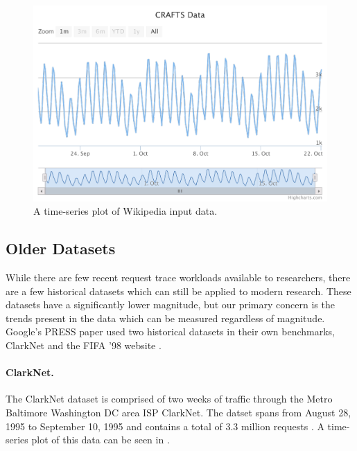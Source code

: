 \begin{figure}
\centering
\includegraphics[width=\textwidth]{charts/wikibench.pdf}
\caption{A time-series plot of Wikipedia input data.}
\label{fig:wikibench}
\end{figure}

\subsection{Older Datasets}
While there are few recent request trace workloads available to researchers, there are a few historical datasets which can still be applied to modern research. These datasets have a significantly lower magnitude, but our primary concern is the trends present in the data which can be measured regardless of magnitude. Google's PRESS paper used two historical datasets in their own benchmarks, ClarkNet and the FIFA '98 website \cite{gong2010press}.

\paragraph{ClarkNet.} The ClarkNet dataset is comprised of two weeks of traffic through the Metro Baltimore Washington DC area ISP ClarkNet. The datset spans from August 28, 1995 to September 10, 1995 and contains a total of 3.3 million requests \cite{clarknet}. A time-series plot of this data can be seen in .

